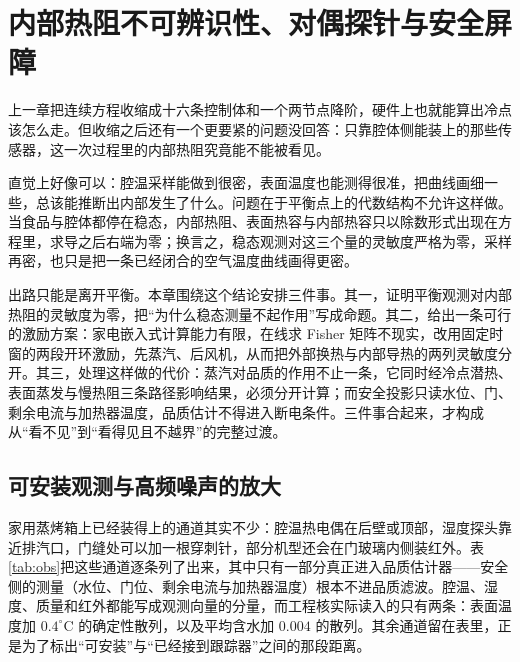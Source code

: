 \chapter{内部热阻不可辨识性、对偶探针与安全屏障}
\label{ch:dual}

上一章把连续方程收缩成十六条控制体和一个两节点降阶，硬件上也就能算出冷点该怎么走。但收缩之后还有一个更要紧的问题没回答：只靠腔体侧能装上的那些传感器，这一次过程里的内部热阻究竟能不能被看见。

直觉上好像可以：腔温采样能做到很密，表面温度也能测得很准，把曲线画细一些，总该能推断出内部发生了什么。问题在于平衡点上的代数结构不允许这样做。当食品与腔体都停在稳态，内部热阻、表面热容与内部热容只以除数形式出现在方程里，求导之后右端为零；换言之，稳态观测对这三个量的灵敏度严格为零，采样再密，也只是把一条已经闭合的空气温度曲线画得更密。

出路只能是离开平衡。本章围绕这个结论安排三件事。其一，证明平衡观测对内部热阻的灵敏度为零，把“为什么稳态测量不起作用”写成命题。其二，给出一条可行的激励方案：家电嵌入式计算能力有限，在线求 Fisher 矩阵不现实，改用固定时窗的两段开环激励，先蒸汽、后风机，从而把外部换热与内部导热的两列灵敏度分开。其三，处理这样做的代价：蒸汽对品质的作用不止一条，它同时经冷点潜热、表面蒸发与慢热阻三条路径影响结果，必须分开计算；而安全投影只读水位、门、剩余电流与加热器温度，品质估计不得进入断电条件。三件事合起来，才构成从“看不见”到“看得见且不越界”的完整过渡。

\section{可安装观测与高频噪声的放大}
\label{ch:est}

家用蒸烤箱上已经装得上的通道其实不少：腔温热电偶在后壁或顶部，湿度探头靠近排汽口，门缝处可以加一根穿刺针，部分机型还会在门玻璃内侧装红外。表\ref{tab:obs}{}把这些通道逐条列了出来，其中只有一部分真正进入品质估计器——安全侧的测量（水位、门位、剩余电流与加热器温度）根本不进品质滤波。腔温、湿度、质量和红外都能写成观测向量的分量，而工程核实际读入的只有两条：表面温度加 \(0.4^\circ\mathrm{C}\) 的确定性散列，以及平均含水加 \(0.004\) 的散列。其余通道留在表里，正是为了标出“可安装”与“已经接到跟踪器”之间的那段距离。

